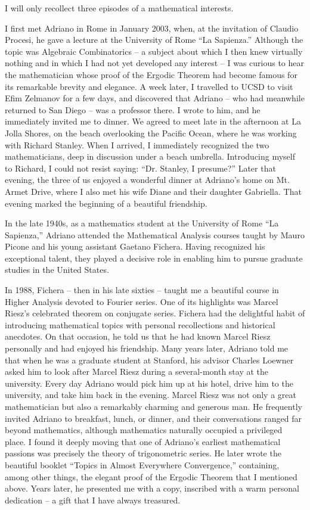 \documentclass{amsart}
\begin{document}
I will only recollect three episodes of a mathematical interests.

I first met Adriano in Rome in January 2003, when, at the invitation of Claudio Procesi, he gave a
lecture at the University of Rome ``La Sapienza.''
Although the topic was Algebraic Combinatorics -- a
subject about which I then knew virtually nothing and in which I had not yet developed any interest --
I was curious to hear the mathematician whose proof of the Ergodic Theorem had become famous for
its remarkable brevity and elegance. A week later, I travelled to UCSD to visit Efim Zelmanov for a few
days, and discovered that Adriano -- who had meanwhile returned to San Diego -- was a professor
there. I wrote to him, and he immediately invited me to dinner. We agreed to meet late in the
afternoon at La Jolla Shores, on the beach overlooking the Pacific Ocean, where he was working with
Richard Stanley. When I arrived, I immediately recognized the two mathematicians, deep in discussion
under a beach umbrella. Introducing myself to Richard, I could not resist saying:
``Dr. Stanley, I
presume?''
Later that evening, the three of us enjoyed a wonderful dinner at Adriano's home on Mt.
Armet Drive, where I also met his wife Diane and their daughter Gabriella. That evening marked the
beginning of a beautiful friendship.

In the late 1940s, as a mathematics student at the University of Rome ``La Sapienza,'' Adriano
attended the Mathematical Analysis courses taught by Mauro Picone and his young assistant Gaetano
Fichera. Having recognized his exceptional talent, they played a decisive role in enabling him to
pursue graduate studies in the United States.

In 1988, Fichera -- then in his late sixties -- taught me a beautiful course in Higher Analysis devoted to
Fourier series. One of its highlights was Marcel Riesz's celebrated theorem on conjugate series.
Fichera had the delightful habit of introducing mathematical topics with personal recollections and
historical anecdotes. On that occasion, he told us that he had known Marcel Riesz personally and had
enjoyed his friendship. Many years later, Adriano told me that when he was a graduate student at
Stanford, his advisor Charles Loewner asked him to look after Marcel Riesz during a several-month
stay at the university. Every day Adriano would pick him up at his hotel, drive him to the university,
and take him back in the evening. Marcel Riesz was not only a great mathematician but also a
remarkably charming and generous man. He frequently invited Adriano to breakfast, lunch, or dinner,
and their conversations ranged far beyond mathematics, although mathematics naturally occupied a
privileged place. I found it deeply moving that one of Adriano's earliest mathematical passions was
precisely the theory of trigonometric series. He later wrote the beautiful booklet ``Topics in Almost
Everywhere Convergence,'' containing, among other things, the elegant proof of the Ergodic Theorem
that I mentioned above. Years later, he presented me with a copy, inscribed with a warm personal
dedication -- a gift that I have always treasured.
\end{document}
